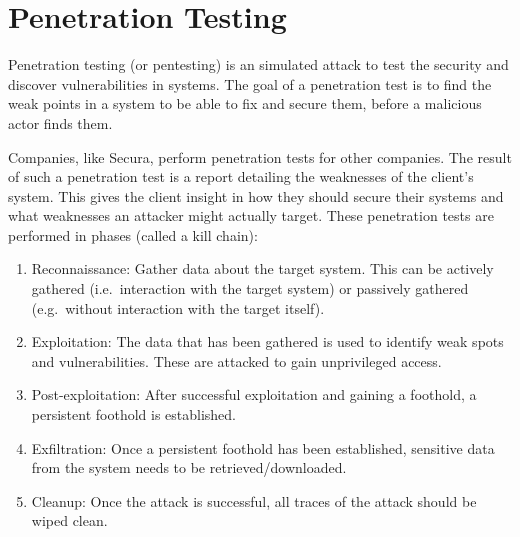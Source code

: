 \section{Penetration Testing}
Penetration testing (or pentesting) is an simulated attack to test the security and discover vulnerabilities in systems. The goal of a penetration test is to find the weak points in a system to be able to fix and secure them, before a malicious actor finds them.

Companies, like Secura, perform penetration tests for other companies. The result of such a penetration test is a report detailing the weaknesses of the client's system. This gives the client insight in how they should secure their systems and what weaknesses an attacker might actually target. These penetration tests are performed in phases (called a kill chain):
\begin{enumerate}
    \item Reconnaissance: Gather data about the target system. This can be actively gathered (i.e.\ interaction with the target system) or passively gathered (e.g.\ without interaction with the target itself).
    \item Exploitation: The data that has been gathered is used to identify weak spots and vulnerabilities. These are attacked to gain unprivileged access.
    \item Post-exploitation: After successful exploitation and gaining a foothold, a persistent foothold is established.
    \item Exfiltration: Once a persistent foothold has been established, sensitive data from the system needs to be retrieved/downloaded.
    \item Cleanup: Once the attack is successful, all traces of the attack should be wiped clean.
\end{enumerate}

\hfill

